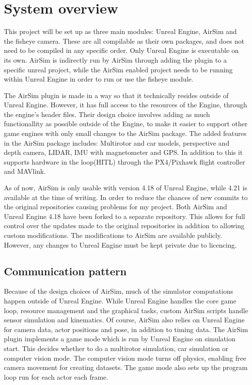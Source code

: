 \section{System overview}

This project will be set up as three main modules: Unreal Engine, AirSim and the fisheye camera. These are all compilable as their own packages, and does not need to be compiled in any specific order. Only Unreal Engine is executable on its own. AirSim is indirectly run by AirSim through adding the plugin to a specific unreal project, while the AirSim enabled project needs to be running within Unreal Engine in order to run or use the fisheye module. 

The AirSim plugin is made in a way so that it technically resides outside of Unreal Engine. However, it has full access to the resources of the Engine, through the engine's header files. Their design choice involves adding as much functionallity as possible outside of the Engine, to make it easier to support other game engines with only small changes to the AirSim package. The added features in the AirSim package includes: Multirotor and car models, perspective and depth camera, LIDAR, IMU with magnetometer and GPS. In addition to this it supports hardware in the loop(HITL) through the PX4/Pixhawk flight controller and MAVlink. 

As of now, AirSim is only usable with version 4.18 of Unreal Engine, while 4.21 is available at the time of writing. In order to reduce the chances of new commits to the original repositories causing problems for my project. Both AirSim and Unreal Engine 4.18 have been forked to a separate repository. This allows for full control over the updates made to the original repositories in addition to allowing custom modifications. The modifications to AirSim are available publicly. However, any changes to Unreal Engine must be kept private due to licencing.

\subsection{Communication pattern}

Because of the design choices of AirSim, much of the simulator computations happen outside of Unreal Engine. While Unreal Engine handles the core game loop, resource management and the graphical tasks, custom AirSim scripts handle sensor simulation and kinematics. Of course, AirSim also relies on Unreal Engine for camera data, actor positions and pose, in addition to timing data. The AirSim plugin implements a game mode which is run by Unreal Engine on simulation start. This decides whether to do a multirotor simulation, car simulation or computer vision mode. The computer vision mode turns off physics, enabling free camera movement for creating datasets. The game mode also sets up the program loop run for each actor each frame.

